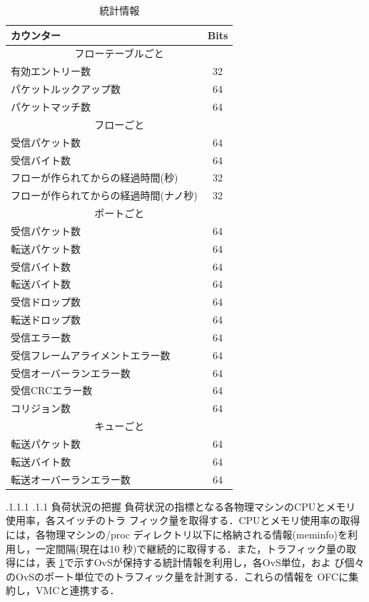 \documentclass[a4paper, twocolumn]{jarticle}
\makeatletter
\def\subsection{\@startsection{subsection}{1}{\z@}%
 {.1\Cvs \@plus.1\Cdp \@minus.1\Cdp}%
 {.1\Cvs \@plus.1\Cdp}%
 {\normalfont\normalsize\bfseries}}
\makeatother
\begin{document}
\begin{table}[t]
	\centering
	\caption{統計情報\cite{opf}}
	\label{tab:counters}
	\vspace{3mm}
	{
		\begin{tabular}{|l|c|} \hline
		カウンター & Bits \\ \hline \hline
		\multicolumn{2}{|c|}{フローテーブルごと} \\ \hline
    有効エントリー数 & 32 \\
    パケットルックアップ数 & 64 \\
    パケットマッチ数 & 64 \\ \hline
		\multicolumn{2}{|c|}{フローごと}\\ \hline
    受信パケット数 & 64 \\
    受信バイト数 & 64 \\
    フローが作られてからの経過時間(秒) & 32 \\
    フローが作られてからの経過時間(ナノ秒) & 32 \\ \hline
		\multicolumn{2}{|c|}{ポートごと} \\ \hline
    受信パケット数 & 64 \\
    転送パケット数 & 64 \\
    受信バイト数 & 64 \\
    転送バイト数 & 64 \\
    受信ドロップ数& 64 \\
    転送ドロップ数& 64 \\
    受信エラー数 & 64 \\
    受信フレームアライメントエラー数 & 64 \\
    受信オーバーランエラー数 & 64 \\
    受信CRCエラー数 & 64 \\
    コリジョン数 & 64 \\ \hline
    \multicolumn{2}{|c|}{キューごと} \\ \hline
    転送パケット数 & 64 \\
    転送バイト数 & 64 \\
    転送オーバーランエラー数 & 64 \\ \hline
		\end{tabular}
	}
\end{table}

\subsection{負荷状況の把握}
負荷状況の指標となる各物理マシンのCPUとメモリ使用率，各スイッチのトラ
フィック量を取得する．CPUとメモリ使用率の取得には，各物理マシンの/proc
ディレクトリ以下に格納される情報(meminfo)を利用し，一定間隔(現在は10
秒)で継続的に取得する．また，トラフィック量の取得には，表
\ref{tab:counters}で示すOvSが保持する統計情報を利用し，各OvS単位，およ
び個々のOvSのポート単位でのトラフィック量を計測する．これらの情報を
OFCに集約し，VMCと連携する．
\end{document}
